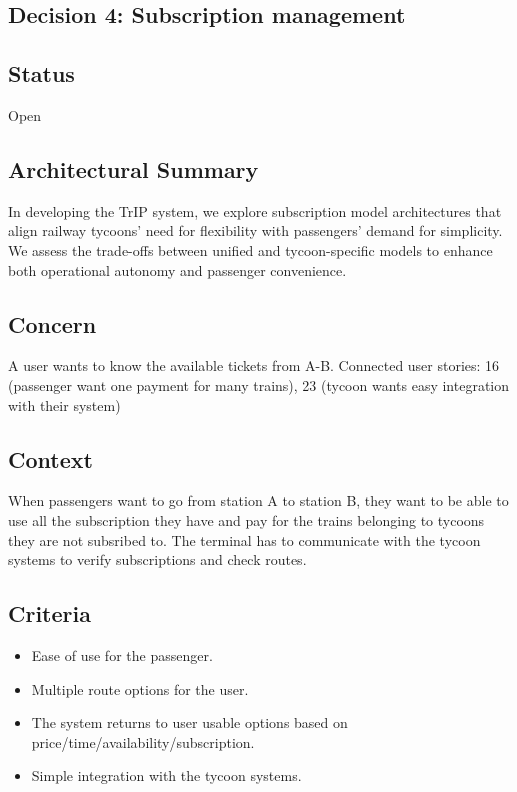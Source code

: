 \subsection{Decision 4: Subscription management}

\subsection*{Status}
Open

\subsection*{Architectural Summary}
In developing the TrIP system, we explore subscription model architectures that align railway tycoons' need for flexibility with passengers' demand for simplicity. 
We assess the trade-offs between unified and tycoon-specific models to enhance both operational autonomy and passenger convenience.

\subsection*{Concern}
A user wants to know the available tickets from A-B. 
Connected user stories: 16 (passenger want one payment for many trains), 23 (tycoon wants easy integration with their system)

\subsection*{Context}
When passengers want to go from station A to station B, they want to be able to use all the subscription they have and pay for the trains belonging to tycoons they are not subsribed to.
The terminal has to communicate with the tycoon systems to verify subscriptions and check routes.

\subsection*{Criteria}
\begin{itemize}
\item Ease of use for the passenger.
\item Multiple route options for the user.
\item The system returns to user usable options based on price/time/availability/subscription.
\item Simple integration with the tycoon systems.
\end{itemize}

